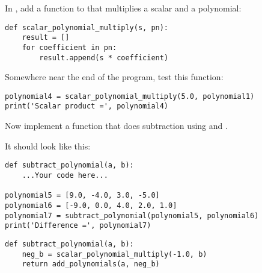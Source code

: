 In , add a function to that multiplies a scalar and a polynomial:
\begin{Verbatim}
def scalar_polynomial_multiply(s, pn):
    result = []
    for coefficient in pn:
        result.append(s * coefficient)
\end{Verbatim}

Somewhere near the end of the program, test this function:
\begin{Verbatim}
polynomial4 = scalar_polynomial_multiply(5.0, polynomial1)
print('Scalar product =', polynomial4)
\end{Verbatim}

\begin{Exercise}[title=Subtract polynomials in Python, label=pysubpoly]
Now implement a function that does subtraction using
 and
.

It should look like this:
\begin{Verbatim}
def subtract_polynomial(a, b):
    ...Your code here...

polynomial5 = [9.0, -4.0, 3.0, -5.0]
polynomial6 = [-9.0, 0.0, 4.0, 2.0, 1.0]
polynomial7 = subtract_polynomial(polynomial5, polynomial6)
print('Difference =', polynomial7)
\end{Verbatim}
\end{Exercise}
\begin{Answer}[ref=pysubpoly]
\begin{Verbatim}
def subtract_polynomial(a, b):
    neg_b = scalar_polynomial_multiply(-1.0, b)
    return add_polynomials(a, neg_b)
\end{Verbatim}
\end{Answer}


    
